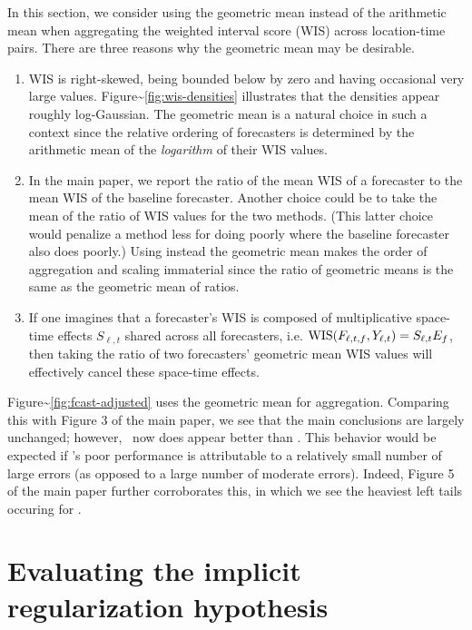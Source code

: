 \documentclass[9pt,twoside,lineno]{pnas-new}
\begin{document}
In this section, we consider using the geometric mean instead of the
arithmetic mean when aggregating the weighted interval score (WIS) across location-time pairs.
There are three reasons why the geometric mean may be desirable.
\begin{enumerate}
\item  WIS is right-skewed, being bounded below by zero and having
  occasional very large values.   Figure\textasciitilde{}\ref{fig:wis-densities} illustrates that the
  densities appear roughly log-Gaussian.  The geometric mean is a
  natural choice in such a context since the relative ordering of forecasters is
  determined by the arithmetic mean of the {\em logarithm} of their WIS
  values.
\item In the main paper, we report the ratio of the mean WIS of a
  forecaster to the mean WIS of the baseline forecaster. Another
  choice could be to take the mean of the ratio of WIS values for the
  two methods. (This latter choice would penalize a method less for
  doing poorly where the baseline forecaster also does poorly.)
Using instead the geometric mean makes the order of aggregation and
scaling immaterial since the ratio of geometric means is the same as
the geometric mean of ratios.
\item If one imagines that a forecaster's WIS is composed of
  multiplicative space-time effects $S_{\ell,t}$ shared across all forecasters,
  i.e. $\mathrm{WIS}(F_{\ell,t,f},Y_{\ell,t})=S_{\ell,t}E_{f}$, then
  taking the ratio of two forecasters' geometric mean WIS values will
  effectively cancel these space-time effects.
\end{enumerate}

Figure\textasciitilde{}\ref{fig:fcast-adjusted} uses the geometric
mean for aggregation.  Comparing this with Figure 3 of the main paper,
we see that the main conclusions are largely unchanged; however,
\chngcli~now does appear better than \ar.  This behavior would be
expected if \chngcli's poor performance is attributable to a
relatively small number of large errors (as opposed to a large number
of moderate errors).  Indeed, Figure 5 of the main paper further
corroborates this, in which we see the heaviest left tails occuring
for \chngcli.

\hypertarget{bootstrap-results}{%
\section{Evaluating the implicit regularization hypothesis}\label{bootstrap-results}}
\end{document}
